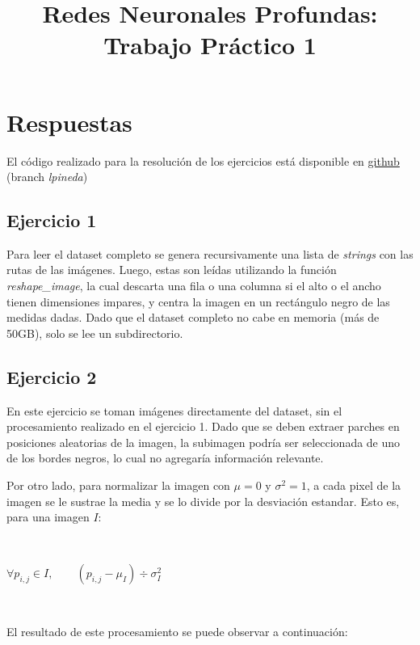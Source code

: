 \documentclass[11pt,spanish]{article}
\begin{document}
\title{Redes Neuronales Profundas: Trabajo Práctico 1}
\date{}
\maketitle

\section*{Respuestas}
El código realizado para la resolución de los ejercicios está disponible en \href{https://github.com/dncampo/deep-learning/tree/lpineda}{github} (branch \textit{lpineda})

\subsection*{Ejercicio 1}
Para leer el dataset completo se genera recursivamente una lista de \textit{strings} con las rutas de las imágenes. Luego, estas son leídas utilizando la función \textit{reshape\_image}, la cual descarta una fila o una columna si el alto o el ancho tienen dimensiones impares, y centra la imagen en un rectángulo negro de las medidas dadas.
Dado que el dataset completo no cabe en memoria (más de 50GB), solo se lee un subdirectorio.

\subsection*{Ejercicio 2}
En este ejercicio se toman imágenes directamente del dataset, sin el procesamiento realizado en el ejercicio 1. Dado que se deben extraer parches en posiciones aleatorias de la imagen, la subimagen podría ser seleccionada de uno de los bordes negros, lo cual no agregaría información relevante.

Por otro lado, para normalizar la imagen con $\mu=0$ y $\sigma^2=1$, a cada pixel de la imagen se le sustrae la media y se lo divide por la desviación estandar. Esto es, para una imagen $I$: 

\ \ 

\begin{center}
	\begin{math}
	\forall p_{i,j} \in I, \qquad (p_{i,j} - \mu_I) \div \sigma^2_I
	\end{math}
\end{center}

\ \

El resultado de este procesamiento se puede observar a continuación:
\end{document}
